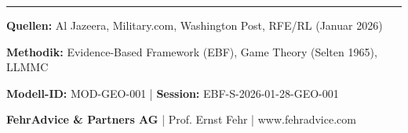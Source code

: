 \documentclass[11pt,a4paper]{article}
\begin{document}
\vfill

\noindent\rule{\textwidth}{0.5pt}

{\small\color{fadarkgray}
\textbf{Quellen:} Al Jazeera, Military.com, Washington Post, RFE/RL (Januar 2026)

\textbf{Methodik:} Evidence-Based Framework (EBF), Game Theory (Selten 1965), LLMMC

\textbf{Modell-ID:} MOD-GEO-001 | \textbf{Session:} EBF-S-2026-01-28-GEO-001

\vspace{2mm}
\textbf{FehrAdvice \& Partners AG} | Prof. Ernst Fehr | www.fehradvice.com
}
\end{document}
